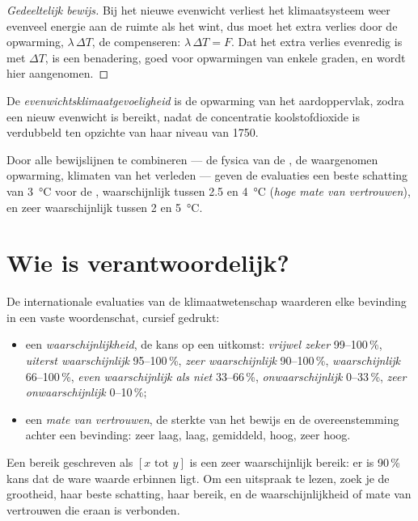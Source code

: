 \begin{proof}[Gedeeltelijk bewijs]
Bij het nieuwe evenwicht verliest het klimaatsysteem weer evenveel energie aan de ruimte
als het wint, dus moet het extra verlies door de opwarming, $\lambda\,\Delta T$, de
 compenseren: $\lambda\,\Delta T = F$. Dat het extra verlies
evenredig is met $\Delta T$, is een benadering, goed voor opwarmingen van enkele
graden, en wordt hier aangenomen.
\end{proof}

\begin{definition}[Evenwichtsklimaatgevoeligheid]\label{def:g12:climate-change:ecs}
De \emph{evenwichtsklimaatgevoeligheid}
is de opwarming van het aardoppervlak, zodra een nieuw evenwicht is bereikt, nadat
de concentratie koolstofdioxide is verdubbeld ten opzichte van haar niveau van 1750.
\end{definition}

\begin{proposition}\label{prop:g12:climate-change:ecs}
Door alle bewijslijnen te combineren --- de fysica van de , de
waargenomen opwarming, klimaten van het verleden --- geven de evaluaties een beste schatting
van \qty{3}{\degreeCelsius} voor de , waarschijnlijk
tussen 2.5 en \qty{4}{\degreeCelsius} (\emph{hoge mate van vertrouwen}), en zeer
waarschijnlijk tussen 2 en \qty{5}{\degreeCelsius}.
\end{proposition}

\section{Wie is verantwoordelijk?}

\begin{method}\label{met:g12:climate-change:language}
De internationale evaluaties van de klimaatwetenschap waarderen elke bevinding in een
vaste woordenschat, cursief gedrukt:
\begin{itemize}
  \item een \emph{waarschijnlijkheid}, de kans op een uitkomst:
        \emph{vrijwel zeker} 99--100\,\%, \emph{uiterst waarschijnlijk}
        95--100\,\%, \emph{zeer waarschijnlijk} 90--100\,\%, \emph{waarschijnlijk}
        66--100\,\%, \emph{even waarschijnlijk als niet} 33--66\,\%,
        \emph{onwaarschijnlijk} 0--33\,\%, \emph{zeer onwaarschijnlijk} 0--10\,\%;
  \item een \emph{mate van vertrouwen}, de sterkte van het bewijs en de overeenstemming
        achter een bevinding: zeer laag, laag, gemiddeld, hoog, zeer hoog.
\end{itemize}
Een bereik geschreven als $[x \text{ tot } y]$ is een zeer waarschijnlijk bereik: er is 90\,\%
kans dat de ware waarde erbinnen ligt. Om een uitspraak te lezen, zoek je
de grootheid, haar beste schatting, haar bereik, en de waarschijnlijkheid of
mate van vertrouwen die eraan is verbonden.
\end{method}

